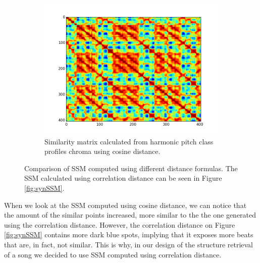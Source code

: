 \begin{figure}[t]
\begin{subfigure}[b]{0.31\textwidth}
                \label{fig:manhattan}
        \end{subfigure}
         \begin{subfigure}[b]{0.31\textwidth}
                \includegraphics[width=\textwidth]{Figures/ssm_cosine}
                \caption{Similarity matrix calculated from harmonic pitch class profiles chroma using cosine distance.}
                \label{fig:cosine}
        \end{subfigure}
          \caption{Comparison of SSM computed using different distance formulas. The SSM calculated using correlation distance can be seen in Figure \ref{fig:synSSM}.}
        \label{fig:ssmdistance}
\end{figure}


When we look at the SSM computed using cosine distance, we can notice that the amount of the similar points increased, more similar to the the one generated using the correlation distance. However, the correlation distance on Figure \ref{fig:synSSM} contains more dark blue spots, implying that it exposes more beats that are, in fact, not similar. This is why, in our design of the structure retrieval of a song we decided to use SSM computed using correlation distance.

\vspace{10pt}


